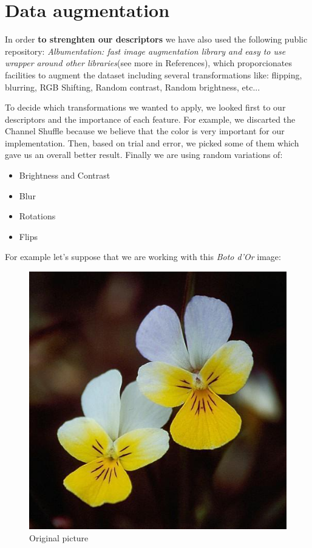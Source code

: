\documentclass[11]{article}
\begin{document}
\section{Data augmentation}
In order \textbf{to strenghten our descriptors} we have also used the following public repository:  \textit{Albumentation: fast image augmentation library and easy to use wrapper around other libraries}(see more in References), which proporcionates facilities to augment the dataset including several transformations like: flipping, blurring, RGB Shifting, Random contrast, Random brightness, etc...
\medskip

To decide which transformations we wanted to apply, we looked first to our descriptors and the importance of each feature. For example, we discarted the Channel Shuffle because we believe that the color is very important for our implementation. Then, based on trial and error, we picked some of them which gave us an overall better result. Finally we are using random variations of:
\begin{itemize}
    \item Brightness and Contrast
    \item Blur
    \item Rotations
    \item Flips
\end{itemize}
For example let's suppose that we are working with this \textit{Boto d'Or} image:
\begin{figure}[H]
    \centering
    \includegraphics[scale=0.25]{images/original.jpg}
    \caption{Original picture}
    \label{original}
\end{figure}
\end{document}
